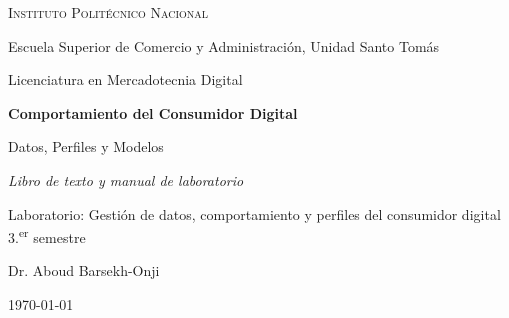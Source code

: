 \begin{titlepage}
\centering
{\scshape\large Instituto Politécnico Nacional\par}
\vspace{0.2cm}
{\large Escuela Superior de Comercio y Administración, Unidad Santo Tomás\par}
\vspace{0.2cm}
{\large Licenciatura en Mercadotecnia Digital\par}
\vspace{2cm}
{\Huge\bfseries Comportamiento del Consumidor Digital\par}
\vspace{0.4cm}
{\Large Datos, Perfiles y Modelos\par}
\vspace{0.6cm}
{\large\itshape Libro de texto y manual de laboratorio\par}
\vspace{0.4cm}
{\normalsize Laboratorio: Gestión de datos, comportamiento y perfiles del consumidor digital \\ 3.\textsuperscript{er} semestre\par}
\vfill
{\large Dr. Aboud Barsekh-Onji\par}
\vspace{0.5cm}
{\normalsize \today\par}
\end{titlepage}
